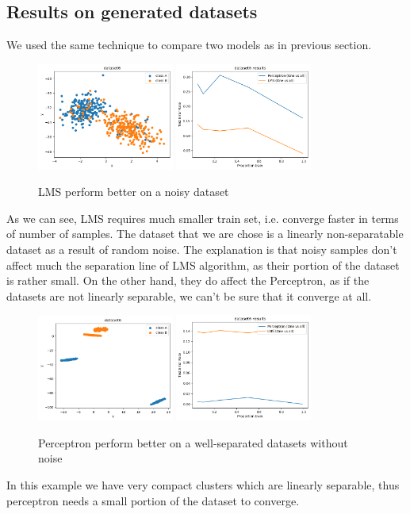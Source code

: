 \documentclass[12pt]{article}
\begin{document}
\subsection{Results on generated datasets}
We used the same technique to compare two models as in previous section. 
\begin{figure}[ht]
	\centering
	\includegraphics[width=0.4\textwidth]{weirdo_hoff_plots/dataset_lms}
	\includegraphics[width=0.4\textwidth]{weirdo_hoff_plots/plot_lms}
	\caption{LMS perform better on a noisy dataset}
\end{figure}
As we can see, LMS requires much smaller train set, i.e. converge faster in terms of number of samples. The dataset that we are chose is a linearly non-separatable dataset as a result of random noise. The explanation is that noisy samples don't affect much the separation line of LMS algorithm, as their portion of the dataset is rather small. On the other hand, they do affect the Perceptron, as if the datasets are not linearly separable, we can't be sure that it converge at all. 

\begin{figure}[ht]
	\centering
	\includegraphics[width=0.4\textwidth]{weirdo_hoff_plots/dataset_perc}
	\includegraphics[width=0.4\textwidth]{weirdo_hoff_plots/plot_perc}
	\caption{Perceptron perform better on a well-separated datasets without noise}			
\end{figure}
In this example we have very compact clusters which are linearly separable, thus perceptron needs a small portion of the dataset to converge. 
\end{document}

